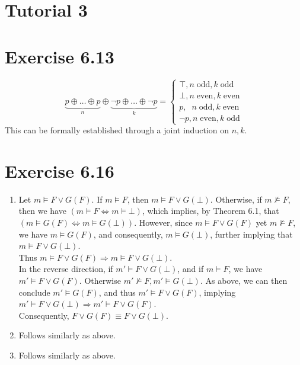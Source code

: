 \documentclass{article}
\begin{document}
\section{Tutorial 3}
\section*{Exercise 6.13}
$$\underbrace{p\oplus\ldots\oplus p}_{n}\oplus\underbrace{\lnot p\oplus\ldots\oplus\lnot p}_{k} = \begin{cases}
\top, n\;\mathrm{odd}, k\;\mathrm{odd}\\
\bot, n\;\mathrm{even}, k\;\mathrm{even}\\
p, \;\;n\;\mathrm{odd}, k\;\mathrm{even}\\
\lnot p, n\;\mathrm{even}, k\;\mathrm{odd}
\end{cases}$$
This can be formally established through a joint induction on $n, k$.
\section*{Exercise 6.16}
\begin{enumerate}[label=(\alph*)]
    \item Let $m\models F\lor G(F)$. If $m\models F$, then $m\models F\lor G(\bot)$. Otherwise, if $m\not\models F$, then we have $(m\models F\Leftrightarrow m\models\bot)$, which implies, by Theorem 6.1, that $(m\models G(F)\Leftrightarrow m\models G(\bot))$. However, since $m\models F\lor G(F)$ yet $m\not\models F$, we have $m\models G(F)$, and consequently, $m\models G(\bot)$, further implying that $m\models F\lor G(\bot)$.\\
    Thus $m\models F\lor G(F)\Rightarrow m\models F\lor G(\bot)$.\\
    In the reverse direction, if $m'\models F\lor G(\bot)$, and if $m\models F$, we have $m'\models F\lor G(F)$. Otherwise $m'\not\models F, m'\models G(\bot)$. As above, we can then conclude $m'\models G(F)$, and thus $m'\models F\lor G(F)$, implying $m'\models F\lor G(\bot)\Rightarrow m'\models F\lor G(F)$.\\
    Consequently, $F\lor G(F)\equiv F\lor G(\bot)$.
    \item Follows similarly as above.
    \item Follows similarly as above.
\end{enumerate}
\end{document}
